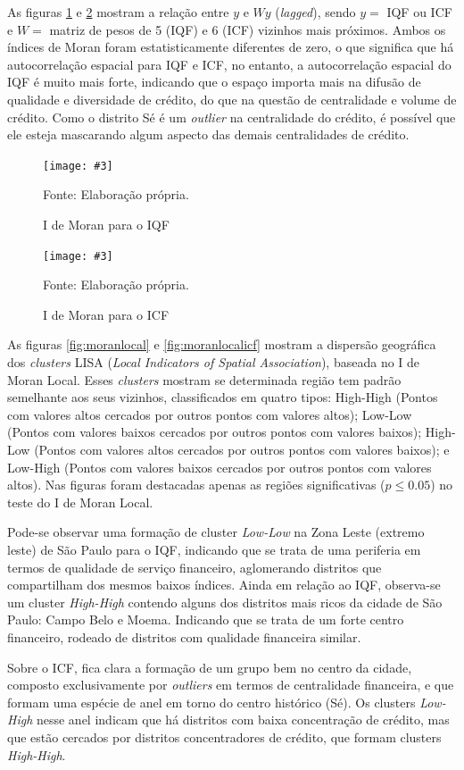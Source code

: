 \documentclass[a4paper,12pt]{article}
\newcommand{\fig}[4]{%
  \begin{figure}[H]
    \centering
    \caption{#1}
    \label{#2}
    \texttt{[image: \#3]}
    
    \vspace{0.5cm}
    
    \begin{footnotesize}
      Fonte: #4
    \end{footnotesize}
  \end{figure}
}
\begin{document}
As figuras \ref{fig:moran} e \ref{fig:moranicf} mostram a relação entre
\(y\) e \(Wy\) (\emph{lagged}), sendo \(y =\) IQF ou ICF e \(W =\)
matriz de pesos de 5 (IQF) e 6 (ICF) vizinhos mais próximos. Ambos os
índices de Moran foram estatisticamente diferentes de zero, o que
significa que há autocorrelação espacial para IQF e ICF, no entanto, a
autocorrelação espacial do IQF é muito mais forte, indicando que o
espaço importa mais na difusão de qualidade e diversidade de crédito, do
que na questão de centralidade e volume de crédito. Como o distrito Sé é
um \emph{outlier} na centralidade do crédito, é possível que ele esteja
mascarando algum aspecto das demais centralidades de crédito.

\fig{I de Moran para o IQF}{fig:moran}{exports/imoraniqf.pdf}{Elaboração própria.}

\fig{I de Moran para o ICF}{fig:moranicf}{exports/imoranicf.pdf}{Elaboração própria.}

As figuras \ref{fig:moranlocal} e \ref{fig:moranlocalicf} mostram a
dispersão geográfica dos \emph{clusters} LISA (\emph{Local Indicators of
Spatial Association}), baseada no I de Moran Local. Esses
\emph{clusters} mostram se determinada região tem padrão semelhante aos
seus vizinhos, classificados em quatro tipos: High-High (Pontos com
valores altos cercados por outros pontos com valores altos); Low-Low
(Pontos com valores baixos cercados por outros pontos com valores
baixos); High-Low (Pontos com valores altos cercados por outros pontos
com valores baixos); e Low-High (Pontos com valores baixos cercados por
outros pontos com valores altos). Nas figuras foram destacadas apenas as
regiões significativas (\(p \leq 0.05\)) no teste do I de Moran Local.

Pode-se observar uma formação de cluster \emph{Low-Low} na Zona Leste
(extremo leste) de São Paulo para o IQF, indicando que se trata de uma
periferia em termos de qualidade de serviço financeiro, aglomerando
distritos que compartilham dos mesmos baixos índices. Ainda em relação
ao IQF, observa-se um cluster \emph{High-High} contendo alguns dos
distritos mais ricos da cidade de São Paulo: Campo Belo e Moema.
Indicando que se trata de um forte centro financeiro, rodeado de
distritos com qualidade financeira similar.

Sobre o ICF, fica clara a formação de um grupo bem no centro da cidade,
composto exclusivamente por \emph{outliers} em termos de centralidade
financeira, e que formam uma espécie de anel em torno do centro
histórico (Sé). Os clusters \emph{Low-High} nesse anel indicam que há
distritos com baixa concentração de crédito, mas que estão cercados por
distritos concentradores de crédito, que formam clusters
\emph{High-High}.
\end{document}
